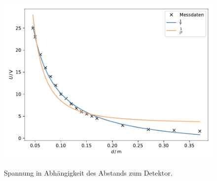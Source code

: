   \begin{figure}
    \centering
    \includegraphics[height=9cm]{Daten/led.pdf}
    \caption{Spannung in Abhängigkeit des Abstands zum Detektor.}
    \label{fig:led}
  \end{figure}